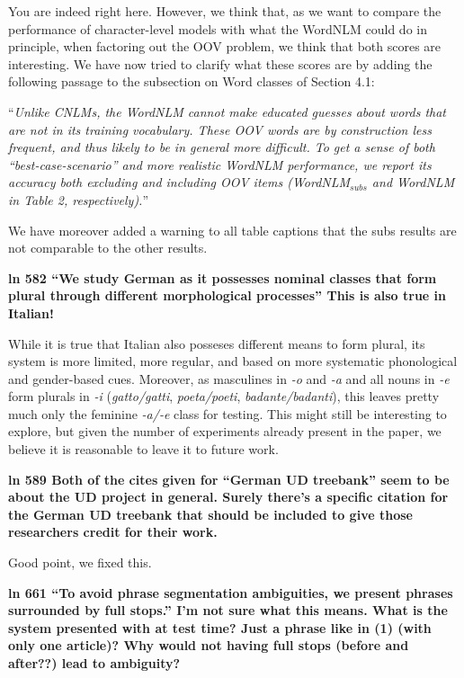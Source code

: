 \documentclass{article}
\begin{document}
You are indeed right here. However, we think that, as we want to compare the performance of character-level models with what the WordNLM could do in principle, when factoring out the OOV problem, we think that both scores are interesting. We have now tried to clarify what these scores are by adding the following passage to the subsection on Word classes of Section 4.1:

``\textit{Unlike CNLMs, the WordNLM cannot make educated guesses about words that are not in its training vocabulary. These OOV words are by construction less frequent, and thus likely to be in general more difficult. To get a sense of both ``best-case-scenario'' and more realistic WordNLM performance, we report its accuracy both excluding and including OOV items (WordNLM$_{subs}$ and WordNLM in Table 2, respectively).}''

We have moreover added a warning to all table captions that the subs results are not comparable to the other results.
\newline

\textbf{ln 582 ``We study German as it possesses nominal classes that form plural through different morphological processes'' This is also true in Italian!}

While it is true that Italian also posseses different means to form plural, its system is more limited, more regular, and based on more systematic phonological and gender-based cues. Moreover, as masculines in \textit{-o} and \textit{-a} and all nouns in \textit{-e} form plurals in \textit{-i}  (\textit{gatto/gatti}, \textit{poeta/poeti}, \textit{badante/badanti}), this leaves pretty much only the feminine \textit{-a/-e} class for testing. This might still be interesting to explore, but given the number of experiments already present in the paper, we believe it is reasonable to leave it to future work.
\newline

\textbf{ln 589 Both of the cites given for ``German UD treebank'' seem to be about the UD project in general. Surely there's a specific citation for the German UD treebank that should be included to give those researchers credit for their work.}

Good point, we fixed this.
\newline

\textbf{ln 661 ``To avoid phrase segmentation ambiguities, we present phrases surrounded by full stops.'' I'm not sure what this means. What is the system presented with at test time? Just a phrase like in (1) (with only one article)? Why would not having full stops (before and after??) lead to ambiguity?}
\end{document}
